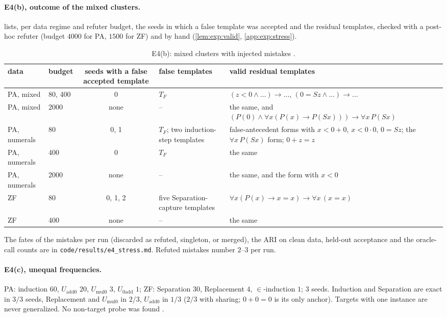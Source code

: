 \paragraph{E4(b), outcome of the mixed clusters.}  lists, per data regime and refuter budget, the seeds in which a false template was accepted and the residual templates, checked with a post-hoc refuter (budget $4000$ for PA, $1500$ for ZF) and by hand (\cref{lem:exp:valid}, \cref{app:exp:stress}).

\begin{table}[ht]
\centering\small
\begin{tabularx}{\textwidth}{@{}llc>{\raggedright\arraybackslash}X>{\raggedright\arraybackslash}X@{}}
\toprule
data & budget & seeds with a false accepted template & false templates & valid residual templates\\
\midrule
PA, mixed & 80, 400 & 0 & $T_F$ & $(z<0\wedge\dots)\to\dots$, $(0=Sz\wedge\dots)\to\dots$\\
PA, mixed & 2000 & none & -- & the same, and $(P(0)\wedge\forall x(P(x)\to P(Sx)))\to\forall x\,P(Sx)$\\
PA, numerals & 80 & 0, 1 & $T_F$; two induction-step templates & false-antecedent forms with $x<0+0$, $x<0\cdot0$, $0=Sz$; the $\forall x\,P(Sx)$ form; $0+z=z$\\
PA, numerals & 400 & 0 & $T_F$ & the same\\
PA, numerals & 2000 & none & -- & the same, and the form with $x<0$\\
ZF & 80 & 0, 1, 2 & five Separation-capture templates & $\forall x(P(x)\to x=x)\to\forall x\,(x=x)$\\
ZF & 400 & none & -- & the same\\
\bottomrule
\end{tabularx}
\caption{E4(b): mixed clusters with injected mistakes .}
\label{tab:exp:e4}
\end{table}

The fates of the mistakes per run (discarded as refuted, singleton, or merged), the ARI on clean data, held-out acceptance and the oracle-call counts are in \texttt{code/results/e4\_stress.md}. Refuted mistakes number $2$--$3$ per run.

\paragraph{E4(c), unequal frequencies.} PA: induction $60$, $U_{\mathrm{add0}}$ $20$, $U_{\mathrm{mul0}}$ $3$, $U_{\mathrm{0add}}$ $1$; ZF: Separation $30$, Replacement $4$, $\in$-induction $1$; $3$ seeds. Induction and Separation are exact in $3/3$ seeds, Replacement and $U_{\mathrm{mul0}}$ in $2/3$, $U_{\mathrm{add0}}$ in $1/3$ ($2/3$ with sharing; $0+0=0$ is its only anchor). Targets with one instance are never generalized. No non-target probe was found .

